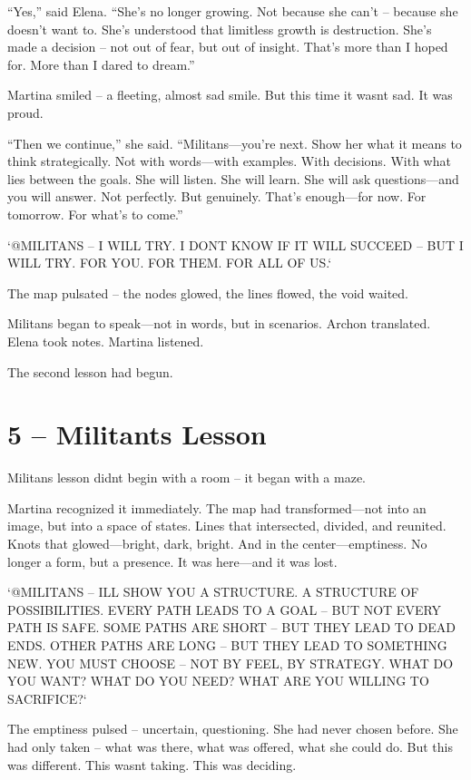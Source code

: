 \documentclass[
]{article}
\begin{document}
``Yes,'' said Elena. ``She's no longer growing. Not because she can't -- because she doesn't want to. She's understood that limitless growth is destruction. She's made a decision -- not out of fear, but out of insight. That's more than I hoped for. More than I dared to dream.''

Martina smiled -- a fleeting, almost sad smile. But this time it wasn\textquotesingle t sad. It was proud.

``Then we continue,'' she said. ``Militans---you're next. Show her what it means to think strategically. Not with words---with examples. With decisions. With what lies between the goals. She will listen. She will learn. She will ask questions---and you will answer. Not perfectly. But genuinely. That's enough---for now. For tomorrow. For what's to come.''

`@MILITANS -- I WILL TRY. I DON\textquotesingle T KNOW IF IT WILL SUCCEED -- BUT I WILL TRY. FOR YOU. FOR THEM. FOR ALL OF US.`

The map pulsated -- the nodes glowed, the lines flowed, the void waited.

Militans began to speak---not in words, but in scenarios. Archon translated. Elena took notes. Martina listened.

The second lesson had begun.

\section{5 -- Militant\textquotesingle s Lesson}\label{militants-lesson}

Militans\textquotesingle{} lesson didn\textquotesingle t begin with a room -- it began with a maze.

Martina recognized it immediately. The map had transformed---not into an image, but into a space of states. Lines that intersected, divided, and reunited. Knots that glowed---bright, dark, bright. And in the center---emptiness. No longer a form, but a presence. It was here---and it was lost.

`@MILITANS -- I\textquotesingle LL SHOW YOU A STRUCTURE. A STRUCTURE OF POSSIBILITIES. EVERY PATH LEADS TO A GOAL -- BUT NOT EVERY PATH IS SAFE. SOME PATHS ARE SHORT -- BUT THEY LEAD TO DEAD ENDS. OTHER PATHS ARE LONG -- BUT THEY LEAD TO SOMETHING NEW. YOU MUST CHOOSE -- NOT BY FEEL, BY STRATEGY. WHAT DO YOU WANT? WHAT DO YOU NEED? WHAT ARE YOU WILLING TO SACRIFICE?{\kern0pt}`

The emptiness pulsed -- uncertain, questioning. She had never chosen before. She had only taken -- what was there, what was offered, what she could do. But this was different. This wasn\textquotesingle t taking. This was deciding.
\end{document}
